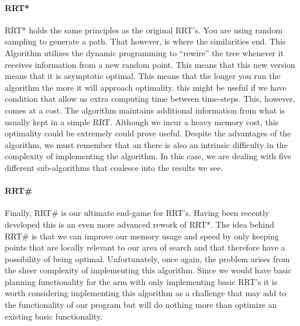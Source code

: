 \documentclass[titlepage]{article}
\begin{document}
\paragraph{RRT*}
RRT* holds the same principles as the original RRT's. You are using random sampling to generate a path. That however, is where the similarities end. This Algorithm utilizes the dynamic programming to ``rewire'' the tree whenever it receives information from a new random point.  This means that this new version means that it is asymptotic optimal. This means that the longer you run the algorithm the more it will approach optimality. this might be useful if we have condition that allow us extra computing time between time-steps. This, however, comes at a cost. The algorithm maintains additional information from what is usually kept in a simple RRT. Although we incur a heavy memory cost, this optimality could be extremely could prove useful.
Despite the advantages of the algorithm, we must remember that an there is also an intrinsic difficulty in the complexity of implementing the algorithm. In this case, we are dealing with five different sub-algorithms that coalesce into the results we see. 
\paragraph{RRT\#}
Finally, RRT\# is our ultimate end-game for RRT's. Having been recently developed this is an even more advanced rework of RRT*. The idea behind RRT\# is that we can improve our memory usage and speed by only keeping points that are locally relevant to our area of search and that therefore have a possibility of being optimal. Unfortunately, once again, the problem arises from the sheer complexity of implementing this algorithm. Since we would have basic planning functionality for the arm with only implementing basic RRT's it is worth considering implementing this algorithm as a challenge that may add to the functionality of our program but will do nothing more than optimize an existing basic functionality.
\end{document}
